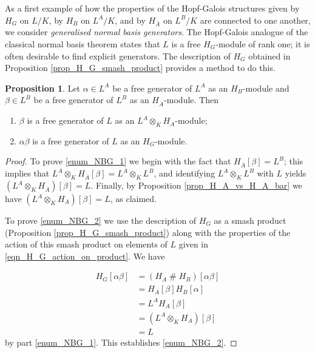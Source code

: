 \documentclass[12pt,a4paper, reqno]{amsart}
\theoremstyle{definition}
\newtheorem{proposition}[theorem]{Proposition}
\begin{document}
As a first example of how the properties of the Hopf-Galois structures given by $ H_{G} $ on $ L/K $, by $ H_{B} $ on $ L^{A}/K $, and by $ H_{\overline{A}} $ on $ L^{B}/K $ are connected to one another, we consider \textit{generalised normal basis generators}. The Hopf-Galois analogue of the classical normal basis theorem \cite[(2.16)]{TWE} states that $ L $ is a free $ H_{G} $-module of rank one; it is often desirable to find explicit generators. The description of $ H_{G} $ obtained in Proposition \ref{prop_H_G_smash_product} provides a method to do this. 

\begin{proposition} \label{prop_NBG}
Let $ \alpha \in L^{A} $ be a free generator of $ L^{A} $ as an $ H_{B} $-module and $ \beta \in L^{B} $ be a free generator of $ L^{B} $ as an $ H_{\overline{A}} $-module. Then
\begin{enumerate}
\item $ \beta $ is a free generator of $ L $ as an $ L^{A} \otimes_{K} H_{A} $-module; \label{enum_NBG_1}
\item $ \alpha\beta $ is a free generator of $ L $ as an $ H_{G} $-module. \label{enum_NBG_2}
\end{enumerate}
\end{proposition}
\begin{proof}
To prove \ref{enum_NBG_1} we begin with the fact that $ H_{\overline{A}} [\beta] = L^{B} $; this implies that $ L^{A} \otimes_{K} H_{\overline{A}} [\beta] = L^{A} \otimes_{K} L^{B} $, and identifying $ L^{A} \otimes_{K} L^{B} $ with $ L $ yields $ (L^{A} \otimes_{K} H_{\overline{A}}) [\beta] = L $. Finally, by Proposition \ref{prop_H_A_vs_H_A_bar} we have $ (L^{A} \otimes_{K} H_{A}) [\beta] = L $, as claimed.

To prove \ref{enum_NBG_2} we use the description of $ H_{G} $ as a smash product (Proposition \ref{prop_H_G_smash_product}) along with the properties of the action of this smash product on elements of $ L $ given in \eqref{eqn_H_G_action_on_product}. We have

\begin{align*}
H_{G}[\alpha\beta] & = (H_{A} \; \# \; H_{B})[\alpha\beta] \\
& = H_{A}[\beta] H_{B}[\alpha] \\
& = L^{A} H_{A}[\beta] \\
& = (L^{A} \otimes_{K} H_{A})[\beta] \\
& = L 
\end{align*}
by part \ref{enum_NBG_1}. This establishes \ref{enum_NBG_2}.
\end{proof}
\end{document}

